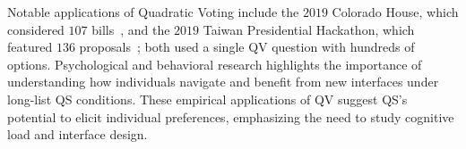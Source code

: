 Notable applications of Quadratic Voting include the $2019$ Colorado House, which considered $107$ bills~\cite{coyNewWayVoting2019}, and the $2019$ Taiwan Presidential Hackathon, which featured $136$ proposals~\cite{QuadraticVotingFrontend2022}; both used a single QV question with hundreds of options. Psychological and behavioral research highlights the importance of understanding how individuals navigate and benefit from new interfaces under long-list QS conditions. These empirical applications of QV suggest QS's potential to elicit individual preferences, emphasizing the need to study cognitive load and interface design.


